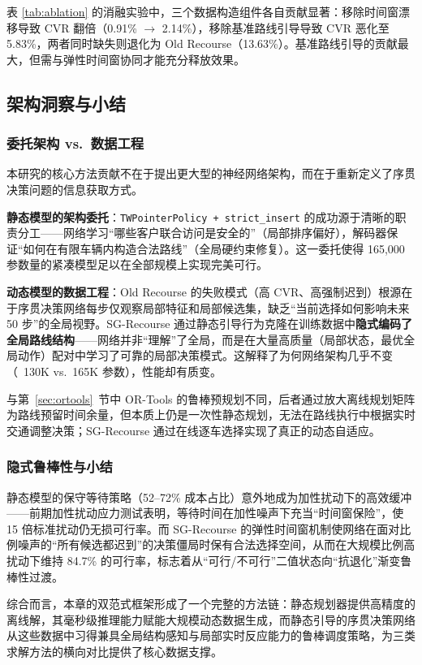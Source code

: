 \documentclass[12pt,a4paper,UTF8]{article}
\begin{document}
表 \ref{tab:ablation} 的消融实验中，三个数据构造组件各自贡献显著：移除时间窗漂移导致 CVR 翻倍（0.91\% $\rightarrow$ 2.14\%），移除基准路线引导导致 CVR 恶化至 5.83\%，两者同时缺失则退化为 Old Recourse（13.63\%）。基准路线引导的贡献最大，但需与弹性时间窗协同才能充分释放效果。

\subsection{架构洞察与小结}

\subsubsection{委托架构 vs.\ 数据工程}

本研究的核心方法贡献不在于提出更大型的神经网络架构，而在于重新定义了序贯决策问题的信息获取方式。

\textbf{静态模型的架构委托}：\texttt{TWPointerPolicy + strict\_insert} 的成功源于清晰的职责分工——网络学习“哪些客户联合访问是安全的”（局部排序偏好），解码器保证“如何在有限车辆内构造合法路线”（全局硬约束修复）。这一委托使得 165,000 参数量的紧凑模型足以在全部规模上实现完美可行。

\textbf{动态模型的数据工程}：Old Recourse 的失败模式（高 CVR、高强制迟到）根源在于序贯决策网络每步仅观察局部特征和局部候选集，缺乏“当前选择如何影响未来 50 步”的全局视野。SG-Recourse 通过静态引导行为克隆在训练数据中\textbf{隐式编码了全局路线结构}——网络并非“理解”了全局，而是在大量高质量（局部状态，最优全局动作）配对中学习了可靠的局部决策模式。这解释了为何网络架构几乎不变（~130K vs.\ 165K 参数），性能却有质变。

与第~\ref{sec:ortools}~节中 OR-Tools 的鲁棒预规划不同，后者通过放大离线规划矩阵为路线预留时间余量，但本质上仍是一次性静态规划，无法在路线执行中根据实时交通调整决策；SG-Recourse 通过在线逐车选择实现了真正的动态自适应。

\subsubsection{隐式鲁棒性与小结}

静态模型的保守等待策略（52--72\% 成本占比）意外地成为加性扰动下的高效缓冲——前期加性扰动应力测试表明，等待时间在加性噪声下充当“时间窗保险”，使 15 倍标准扰动仍无损可行率。而 SG-Recourse 的弹性时间窗机制使网络在面对比例噪声的“所有候选都迟到”的决策僵局时保有合法选择空间，从而在大规模比例高扰动下维持 84.7\% 的可行率，标志着从“可行/不可行”二值状态向“抗退化”渐变鲁棒性过渡。

综合而言，本章的双范式框架形成了一个完整的方法链：静态规划器提供高精度的离线解，其毫秒级推理能力赋能大规模动态数据生成，而静态引导的序贯决策网络从这些数据中习得兼具全局结构感知与局部实时反应能力的鲁棒调度策略，为三类求解方法的横向对比提供了核心数据支撑。
\end{document}
